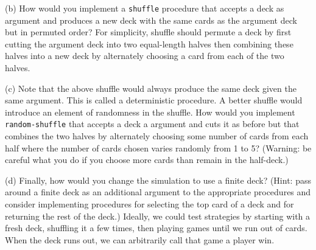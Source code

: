(b) How would you implement a {\tt shuffle} procedure that accepts a
deck as argument and produces a new deck with the same cards as the
argument deck but in permuted order?  For simplicity, shuffle should
permute a deck by first cutting the argument deck into two
equal-length halves then combining these halves into a new deck by
alternately choosing a card from each of the two halves.

(c) Note that the above shuffle would always produce the same deck
given the same argument.  This is called a deterministic procedure.  A
better shuffle would introduce an element of randomness in the
shuffle.  How would you implement {\tt random-shuffle} that accepts a
deck a argument and cuts it as before but that combines the two halves
by alternately choosing some number of cards from each half where the
number of cards chosen varies randomly from 1 to 5?  (Warning: be
careful what you do if you choose more cards than remain in the
half-deck.)

(d)  Finally, how would you change the simulation to use a finite deck?
(Hint: pass around a finite deck as an additional argument to the
appropriate procedures and consider implementing procedures for
selecting the top card of a deck and for returning the rest of the
deck.) Ideally, we could test strategies by starting with a fresh
deck, shuffling it a few times, then playing games until we run out of
cards. When the deck runs out, we can arbitrarily call that game a
player win.


